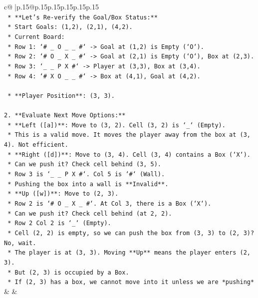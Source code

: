\documentclass{article}
\begin{document}
{\begin{supertabular}{c@{$\;$}|p{.15\linewidth}@{}p{.15\linewidth}p{.15\linewidth}p{.15\linewidth}p{.15\linewidth}p{.15\linewidth}}
{{{\\ 
\texttt{    *   **Let's Re{-}verify the Goal/Box Status:**} \\
\texttt{        *   Start Goals: (1,2), (2,1), (4,2).} \\
\texttt{        *   Current Board:} \\
\texttt{            *   Row 1: `\# \_ O \_ \_ \#` {-}> Goal at (1,2) is Empty (`O`).} \\
\texttt{            *   Row 2: `\# O \_ X \_ \#` {-}> Goal at (2,1) is Empty (`O`), Box at (2,3).} \\
\texttt{            *   Row 3: `\_ \_ P X \#` {-}> Player at (3,3), Box at (3,4).} \\
\texttt{            *   Row 4: `\# X O \_ \_ \#` {-}> Box at (4,1), Goal at (4,2).} \\
\\ 
\texttt{    *   **Player Position**: (3, 3).} \\
\\ 
\texttt{2.  **Evaluate Next Move Options:**} \\
\texttt{    *   **Left ({[}a{]})**: Move to (3, 2). Cell (3, 2) is `\_` (Empty).} \\
\texttt{        *   This is a valid move. It moves the player away from the box at (3, 4). Not efficient.} \\
\texttt{    *   **Right ({[}d{]})**: Move to (3, 4). Cell (3, 4) contains a Box (`X`).} \\
\texttt{        *   Can we push it? Check cell behind (3, 5).} \\
\texttt{        *   Row 3 is `\_ \_ P X \#`. Col 5 is `\#` (Wall).} \\
\texttt{        *   Pushing the box into a wall is **Invalid**.} \\
\texttt{    *   **Up ({[}w{]})**: Move to (2, 3).} \\
\texttt{        *   Row 2 is `\# O \_ X \_ \#`. At Col 3, there is a Box (`X`).} \\
\texttt{        *   Can we push it? Check cell behind (at 2, 2).} \\
\texttt{        *   Row 2 Col 2 is `\_` (Empty).} \\
\texttt{        *   Cell (2, 2) is empty, so we can push the box from (3, 3) to (2, 3)? No, wait.} \\
\texttt{        *   The player is at (3, 3). Moving **Up** means the player enters (2, 3).} \\
\texttt{        *   But (2, 3) is occupied by a Box.} \\
\texttt{        *   If (2, 3) has a box, we cannot move into it unless we are *pushing*} \\
            }
        }
    }
    & & \\ \\


\end{supertabular}}
\end{document}
